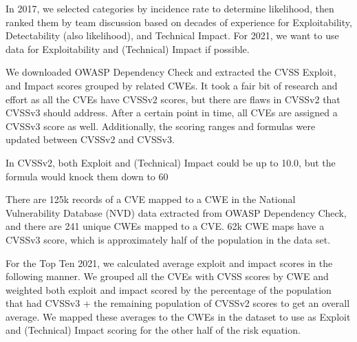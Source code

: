 In 2017, we selected categories by incidence rate to determine likelihood, then ranked them by team discussion based on decades of experience for Exploitability, Detectability (also likelihood), and Technical Impact. For 2021, we want to use data for Exploitability and (Technical) Impact if possible.

We downloaded OWASP Dependency Check and extracted the CVSS Exploit, and Impact scores grouped by related CWEs. It took a fair bit of research and effort as all the CVEs have CVSSv2 scores, but there are flaws in CVSSv2 that CVSSv3 should address. After a certain point in time, all CVEs are assigned a CVSSv3 score as well. Additionally, the scoring ranges and formulas were updated between CVSSv2 and CVSSv3.

In CVSSv2, both Exploit and (Technical) Impact could be up to 10.0, but the formula would knock them down to 60%

There are 125k records of a CVE mapped to a CWE in the National Vulnerability Database (NVD) data extracted from OWASP Dependency Check, and there are 241 unique CWEs mapped to a CVE. 62k CWE maps have a CVSSv3 score, which is approximately half of the population in the data set.

For the Top Ten 2021, we calculated average exploit and impact scores in the following manner. We grouped all the CVEs with CVSS scores by CWE and weighted both exploit and impact scored by the percentage of the population that had CVSSv3 + the remaining population of CVSSv2 scores to get an overall average. We mapped these averages to the CWEs in the dataset to use as Exploit and (Technical) Impact scoring for the other half of the risk equation.
